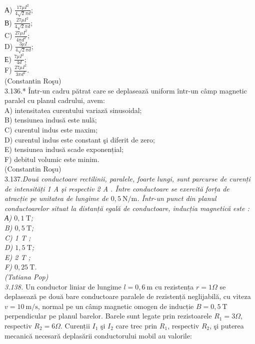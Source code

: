 \documentclass[10pt]{article}
\begin{document}
А) $\frac{17 \mu I^{2}}{4 \sqrt{2} \pi d}$;\\
В) $\frac{27 \mu I^{2}}{4 \sqrt{2} \pi d}$;\\
C) $\frac{27 \mu I^{2}}{4 \pi d^{2}}$;\\
D) $\frac{3 \mu I}{4 \sqrt{2} \pi d}$;\\
Е) $\frac{7 \mu I^{2}}{4 d}$;\\
F) $\frac{27 \mu I^{2}}{3 \pi d^{2}}$.\\
(Constantin Roşu)\\
3.136.* Într-un cadru pătrat care se deplasează uniform într-un câmp magnetic paralel cu planul cadrului, avem:\\
A) intensitatea curentului variază sinusoidal;\\
B) tensiunea indusă este nulă;\\
C) curentul indus este maxim;\\
D) curentul indus este constant şi diferit de zero;\\
E) tensiunea indusă scade exponențial;\\
F) debitul volumic este minim.\\
(Constantin Roşu)\\
3.137.\textit{Două conductoare rectilinii, paralele, foarte lungi, sunt parcurse de curenți de intensități 1 A şi respectiv 2 A . Între conductoare se exercită forța de\\
atracție pe unitatea de lungime de $0,5 \mathrm{~N} / \mathrm{m}$. Într-un punct din planul conductoarelor situat la distanță egală de conductoare, inducția magnetică este :\\
А) $0,1 \mathrm{~T}$;\\
B) $0,5 \mathrm{~T}$;\\
C) 1 T ;\\
D) $1,5 \mathrm{~T}$;\\
E) 2 T ;\\
F) $0,25 \mathrm{~T}$.\\
(Tatiana Pop)\\
3.138.} Un conductor liniar de lungime $l=0,6 \mathrm{~m}$ cu rezistența $r=1 \Omega$ se deplasează pe două bare conductoare paralele de rezistență neglijabilă, cu viteza $v=10 \mathrm{~m} / \mathrm{s}$, normal pe un câmp magnetic omogen de inducție $B=0,5 \mathrm{~T}$ perpendicular pe planul barelor. Barele sunt legate prin rezistoarele $R_{1}=3 \Omega$, respectiv $R_{2}=6 \Omega$. Curenții $I_{1}$ şi $I_{2}$ care trec prin $R_{1}$, respectiv $R_{2}$, şi puterea mecanică necesară deplasării conductorului mobil au valorile:\\
\end{document}
